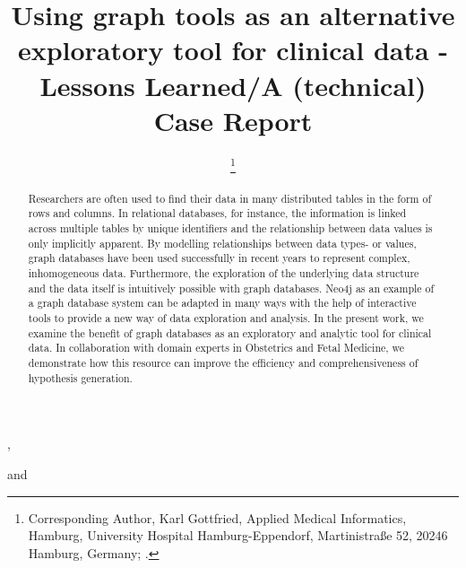 \documentclass[aac]{iosart2x}
\begin{document}
\begin{frontmatter}

{\centering \title{Using graph tools as an alternative exploratory tool for clinical data - 
Lessons Learned/A (technical) Case Report
}}


\author[A]{ %
\thanks{Corresponding Author, Karl Gottfried, Applied Medical Informatics, Hamburg, University Hospital Hamburg-Eppendorf, Martinistraße 52, 20246 Hamburg, Germany;  .}},
\author[A]{ }
and
\author[A]{ }
\address[A]{Applied Medical Informatics, , Germany, ,
}
\address[B]{Department first, ,
Abbreviate US states, }


\begin{abstract}

Researchers are often used to find their data in many distributed tables in the form of rows and columns. In relational databases, for instance, the information is linked across multiple tables by unique identifiers and the relationship between data values is only implicitly apparent. By modelling relationships between data types- or values, graph databases have been used successfully in recent years to represent complex, inhomogeneous data. Furthermore, the exploration of the underlying data structure and the data itself is intuitively possible with graph databases. Neo4j as an example of a graph database system can be adapted in many ways with the help of interactive tools to provide a new way of data exploration and analysis. In the present work, we examine the benefit of graph databases as an exploratory and analytic tool for clinical data. In collaboration with domain experts in Obstetrics and Fetal Medicine, we demonstrate how this resource can improve the efficiency and comprehensiveness of hypothesis generation.
\end{abstract}

\begin{keyword}
\end{keyword}

\end{frontmatter}
\end{document}

